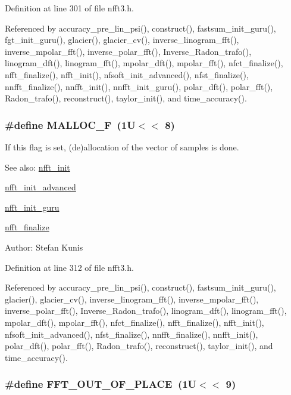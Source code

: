 Definition at line 301 of file nfft3.h.

Referenced by accuracy\_\-pre\_\-lin\_\-psi(), construct(), fastsum\_\-init\_\-guru(), fgt\_\-init\_\-guru(), glacier(), glacier\_\-cv(), inverse\_\-linogram\_\-fft(), inverse\_\-mpolar\_\-fft(), inverse\_\-polar\_\-fft(), Inverse\_\-Radon\_\-trafo(), linogram\_\-dft(), linogram\_\-fft(), mpolar\_\-dft(), mpolar\_\-fft(), nfct\_\-finalize(), nfft\_\-finalize(), nfft\_\-init(), nfsoft\_\-init\_\-advanced(), nfst\_\-finalize(), nnfft\_\-finalize(), nnfft\_\-init(), nnfft\_\-init\_\-guru(), polar\_\-dft(), polar\_\-fft(), Radon\_\-trafo(), reconstruct(), taylor\_\-init(), and time\_\-accuracy().\hypertarget{group__nfft_ga7b5098f4136080bbe0dd989973e2a69}{
\subsubsection{\setlength{\rightskip}{0pt plus 5cm}\#define MALLOC\_\-F~(1U$<$$<$ 8)}}
\label{group__nfft_ga7b5098f4136080bbe0dd989973e2a69}


If this flag is set, (de)allocation of the vector of samples is done. 

\begin{Desc}
\item[See also:]\hyperlink{group__nfft_g1dfeaf18f3735f035afa62ca768d99c4}{nfft\_\-init} 

\hyperlink{group__nfft_gcd4a22fd1f6ea476a57759a90510d114}{nfft\_\-init\_\-advanced} 

\hyperlink{group__nfft_g406f05717c6299b918261c61aaa9de23}{nfft\_\-init\_\-guru} 

\hyperlink{group__nfft_g614f9f7af5b0d5491afa9495393c4dc3}{nfft\_\-finalize} \end{Desc}
\begin{Desc}
\item[Author:]Stefan Kunis \end{Desc}


Definition at line 312 of file nfft3.h.

Referenced by accuracy\_\-pre\_\-lin\_\-psi(), construct(), fastsum\_\-init\_\-guru(), glacier(), glacier\_\-cv(), inverse\_\-linogram\_\-fft(), inverse\_\-mpolar\_\-fft(), inverse\_\-polar\_\-fft(), Inverse\_\-Radon\_\-trafo(), linogram\_\-dft(), linogram\_\-fft(), mpolar\_\-dft(), mpolar\_\-fft(), nfct\_\-finalize(), nfft\_\-finalize(), nfft\_\-init(), nfsoft\_\-init\_\-advanced(), nfst\_\-finalize(), nnfft\_\-finalize(), nnfft\_\-init(), polar\_\-dft(), polar\_\-fft(), Radon\_\-trafo(), reconstruct(), taylor\_\-init(), and time\_\-accuracy().\hypertarget{group__nfft_g9193f768d5839892d0e303080c370eaf}{
\subsubsection{\setlength{\rightskip}{0pt plus 5cm}\#define FFT\_\-OUT\_\-OF\_\-PLACE~(1U$<$$<$ 9)}}
\label{group__nfft_g9193f768d5839892d0e303080c370eaf}


